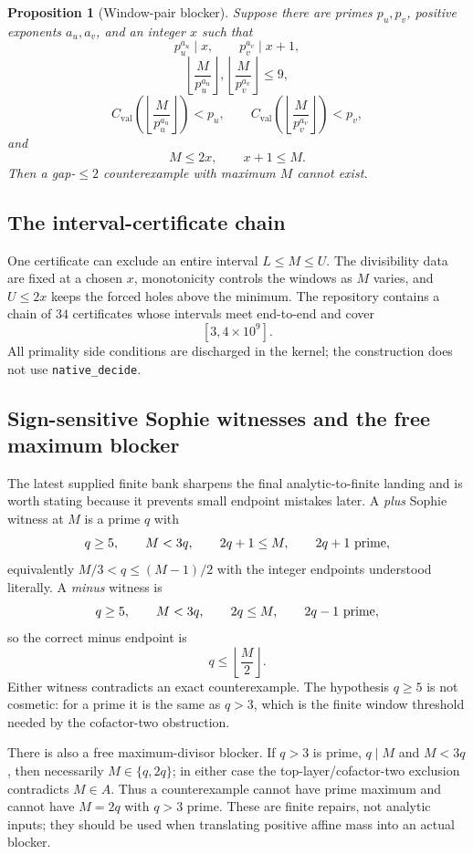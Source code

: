 \documentclass[11pt]{article}
\newtheorem{proposition}[theorem]{Proposition}
\theoremstyle{definition}
\newcommand{\1}{\mathbf 1}
\begin{document}
\begin{proposition}[Window-pair blocker]
Suppose there are primes $p_u,p_v$, positive exponents $a_u,a_v$, and an integer $x$ such
that
\[
p_u^{a_u}\mid x,\qquad p_v^{a_v}\mid x+1,
\]
\[
\left\lfloor\frac M{p_u^{a_u}}\right\rfloor,
\left\lfloor\frac M{p_v^{a_v}}\right\rfloor\le9,
\]
\[
C_{\mathrm{val}}\!\left(\left\lfloor\frac M{p_u^{a_u}}\right\rfloor\right)<p_u,
\qquad
C_{\mathrm{val}}\!\left(\left\lfloor\frac M{p_v^{a_v}}\right\rfloor\right)<p_v,
\]
and
\[
M\le2x,
\qquad x+1\le M.
\]
Then a gap-$\le2$ counterexample with maximum $M$ cannot exist.
\end{proposition}

\subsection{The interval-certificate chain}

One certificate can exclude an entire interval $L\le M\le U$.  The divisibility data are
fixed at a chosen $x$, monotonicity controls the windows as $M$ varies, and $U\le2x$
keeps the forced holes above the minimum.  The repository contains a chain of $34$
certificates whose intervals meet end-to-end and cover
\[
[3,4\times10^9].
\]
All primality side conditions are discharged in the kernel; the construction does not use
\texttt{native\_decide}.


\subsection{Sign-sensitive Sophie witnesses and the free maximum blocker}

The latest supplied finite bank sharpens the final analytic-to-finite landing and is worth stating because it
prevents small endpoint mistakes later.  A \emph{plus} Sophie witness at $M$ is a prime $q$ with
\[
 q\ge5,\qquad M<3q,\qquad 2q+1\le M,\qquad 2q+1\ \hbox{prime},
\]
equivalently $M/3<q\le (M-1)/2$ with the integer endpoints understood literally.  A \emph{minus} witness is
\[
 q\ge5,\qquad M<3q,\qquad 2q\le M,\qquad 2q-1\ \hbox{prime},
\]
so the correct minus endpoint is
\[
 \boxed{q\le\left\lfloor\frac M2\right\rfloor.}
\]
Either witness contradicts an exact counterexample.  The hypothesis $q\ge5$ is not cosmetic: for a prime it is
the same as $q>3$, which is the finite window threshold needed by the cofactor-two obstruction.

There is also a free maximum-divisor blocker.  If $q>3$ is prime, $q\mid M$ and $M<3q$, then necessarily
$M\in\{q,2q\}$; in either case the top-layer/cofactor-two exclusion contradicts $M\in A$.  Thus a counterexample
cannot have prime maximum and cannot have $M=2q$ with $q>3$ prime.  These are finite repairs, not analytic
inputs; they should be used when translating positive affine mass into an actual blocker.
\end{document}
